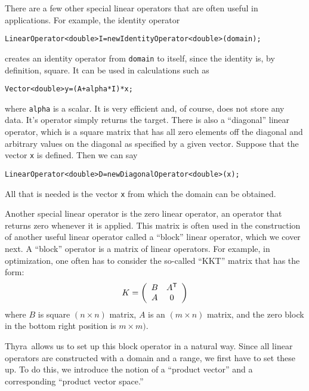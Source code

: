 \documentclass[12pt]{article}
\newcommand{\bd}{\begin{displaymath}}
\newcommand{\ed}{\end{displaymath}}
\newcommand{\trp}{^{\sf T}}
\newcommand{\bry}{\begin{array}}
\newcommand{\ery}{\end{array}}
\newcommand{\thyra}{{\sf Thyra}}
\newcommand{\lcode}[1]{{\tt #1}}
\newenvironment{dcode}{  \begin{center} 
    \begin{minipage}{.9\textwidth}
     \begin{alltt}}
{\end{alltt}
    \end{minipage}
  \end{center}}
\newcommand{\bdcode}{\begin{dcode}}
\newcommand{\edcode}{\end{dcode}}
\begin{document}
There are a few other special linear operators that are often useful
in applications.  For example, the identity operator
\bdcode
LinearOperator<double> I = new IdentityOperator<double>(domain);
\edcode
creates an identity operator from \lcode{domain} to itself, since the
identity is, by definition, square.  It can be used in calculations
such as 
\bdcode
Vector<double> y = (A + alpha * I) * x;
\edcode
where \lcode{alpha} is a scalar.  It is very efficient and, of course,
does not store any data. It's \lcode{*} operator simply returns the
target. There is also a ``diagonal'' linear operator, which is a
square matrix that has all zero elements off the diagonal and
arbitrary values on the diagonal as specified by a given vector.
Suppose that the vector \lcode{x} is defined.  Then we can say
\bdcode
LinearOperator<double> D = new DiagonalOperator<double>(x);
\edcode
All that is needed is the vector \lcode{x} from which the domain can
be obtained.

Another special linear operator is the zero linear operator, an
operator that returns zero whenever it is applied.  This matrix is
often used in the construction of another useful linear operator
called a ``block'' linear operator, which we cover next.  A ``block''
operator is a matrix of linear operators.  For example, in
optimization, one often has to consider the so-called ``KKT'' matrix
that has the form:
\bd
      K = \left( \bry{cc} B & A\trp \\ A & 0 \ery \right)
\ed
where $B$ is square $(n \times n)$ matrix, $A$ is an $(m \times n)$
matrix, and the zero block in the bottom right position is $m \times
m)$.  

\thyra\ allows us to set up this block operator in a natural
way. Since all linear operators are constructed with a domain and a
range, we first have to set these up.  To do this, we introduce the
notion of a ``product vector'' and a corresponding ``product vector
space.'' 
\end{document}
